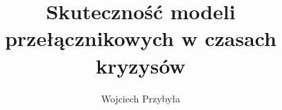\usepackage{config/uepThesis}
\usepackage{config/uepTitle}
	\title{Skuteczność modeli przełącznikowych w czasach kryzysów}
	\author{Wojciech Przybyła}

\usepackage{booktabs}
\pagestyle{headings}
\usepackage{fancyhdr} 
\usepackage{color}
\usepackage{polski}
\usepackage{float}
  \makeatletter
	\renewcommand{\slimits@}{\limits} %
	\renewcommand{\nmlimits@}{\limits}
	\makeatother
	\renewcommand{\le}{\leqslant} %
	\renewcommand{\ge}{\geqslant}

\usepackage{setspace}
\setlength\parindent{0.5cm}
\setlength{\headheight}{15pt}


\newcommand{\doubleC}{\mathbb{C}}
\newcommand{\doubleE}{\mathbb{E}}
\newcommand{\doubleK}{\mathbb{K}}
\newcommand{\doubleN}{\mathbb{N}}
\newcommand{\doubleP}{\mathbb{P}}
\newcommand{\doubleQ}{\mathbb{Q}}
\newcommand{\doubleR}{\mathbb{R}}
\newcommand{\doubleS}{\mathbb{S}}
\newcommand{\doubleZ}{\mathbb{Z}}
\newcommand{\scriptC}{\mathcal{C}}
\DeclareMathOperator{\tr}{tr}
\DeclareMathOperator{\Var}{Var}
\DeclareMathOperator{\Cov}{Cov}
\newcommand{\nz}[1]{\left( #1 \right)} %
\newcommand{\nk}[1]{\left[ #1 \right]} %
\newcommand{\set}[1]{\left\{ #1 \right\}}
\newcommand{\abs}[1]{\left| #1 \right|}
\newcommand{\norm}[1]{\left\| #1 \right\|}
\newcommand{\floor}[1]{\left\lfloor #1 \right\rfloor}
\newcommand{\ceil}[1]{\left\lceil #1 \right\rceil}
\newcommand{\A}[1]{\bigwedge_{#1}}
\newcommand{\E}[1]{\bigvee_{#1}}
\newcommand{\pcg}{\quad\Rightarrow\quad}%
\newcommand{\pcgc}{\quad&\Rightarrow\quad}%
\newcommand{\pcgk}{\Rightarrow}%
\newcommand{\pcgd}{\quad\Longrightarrow\quad}%
\newcommand{\xpcg}[1]{\overset{#1}{\pcg}}%
\newcommand{\wtw}{\quad\Leftrightarrow\quad}%
\newcommand{\wtwc}{\quad&\Leftrightarrow\quad}
\newcommand{\wtwk}{\Leftrightarrow}
\newcommand{\wtwd}{\Longleftrightarrow}
\newcommand{\xwtw}[1]{\overset{#1}{\wtw}}
\newcommand{\lwtw}{\leftrightarrow}%
\makeatletter
\newcommand{\xto}[2][]{\ext@arrow 0099\rightarrowfill@{#1}{#2}}
\makeatother
\newcommand{\bbar}[1]{\overline{\overline{#1}}}
\newcommand{\whichis}[2]{\underbrace{#2}_{#1}}
\newcommand{\oo}{\infty}

